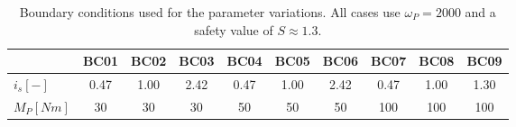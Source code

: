 \begin{table}[ht]
\centering
\begin{tabular}{l|c c c c c c c c c}
  \toprule
   & BC01 & BC02 & BC03 & BC04 & BC05 & BC06 & BC07 & BC08 & BC09\\
  \midrule
  $i_s [\unit{-}]$  & 0.47 & 1.00 & 2.42 & 0.47 & 1.00 & 2.42 & 0.47 & 1.00 & 1.30\\
  $M_P \unit{[Nm]}$ & 30   & 30   & 30   & 50   & 50   & 50   & 100  & 100  & 100\\
  \bottomrule
\end{tabular}
\caption[Boundary conditions used for the parameter variations]{Boundary conditions used for the parameter variations. All cases use $\omega_P = 2000$ \RPM and a safety value of $S \approx 1.3$.}
\label{tab:BCCasesForParVar}
\end{table}

%
%
%